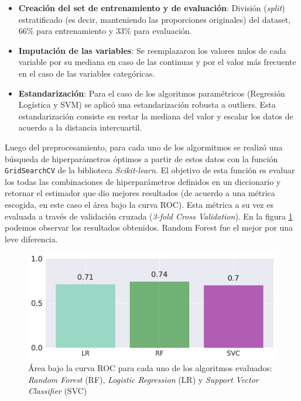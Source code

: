 \begin{itemize}
    \item \textbf{Creación del set de entrenamiento y de evaluación}: División (\textit{split}) estratificado (es decir, manteniendo las proporciones originales) del dataset, 66\% para entrenamiento y 33\% para evaluación. 
    \item \textbf{Imputación de las variables}: Se reemplazaron los valores nulos de cada variable por su mediana en caso de las continuas y por el valor más frecuente en el caso de las variables categóricas.
    \item \textbf{Estandarización}: Para el caso de los algoritmos paramétricos (Regresión Logística y SVM) se aplicó una estandarización robusta a outliers. Esta estandarización consiste en restar la mediana del valor y escalar los datos de acuerdo a la distancia intercuartil.
\end{itemize}

Luego del preprocesamiento, para cada uno de los algormitmos se realizó una búsqueda de hiperparámetros óptimos a partir de estos datos con la función \texttt{GridSearchCV} de la biblioteca \textit{Scikit-learn}. El objetivo de esta función es evaluar los todas las combinaciones de hiperparámetros definidos en un diccionario y retornar el estimador que dio mejores resultados (de acuerdo a una métrica escogida, en este caso el área bajo la curva ROC). Esta métrica a su vez es evaluada a través de validación cruzada (\textit{3-fold Cross Validation}). En la figura \ref{fig:resultados_varq} podemos observar los resultados obtenidos. Random Forest fue el mejor por una leve diferencia. 


\begin{figure}[H]
    \centering
    \includegraphics[scale=0.55]{documents/latex/figures/3/resultados_varq.pdf}
    \caption{Área bajo la curva ROC para cada uno de los algoritmos evaluados: \textit{Random Forest} (RF), \textit{Logistic Regression} (LR) y \textit{Support Vector Classifier} (SVC)}
    \label{fig:resultados_varq}
\end{figure}

